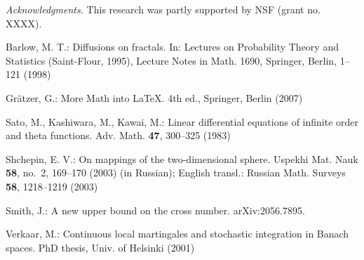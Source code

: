 \documentclass[12pt, twoside]{article}
\theoremstyle{definition}
\numberwithin{equation}{section}
\begin{document}
\bigskip
\footnotesize
\noindent\textit{Acknowledgments.}
This research was partly supported by NSF (grant no. XXXX).

\begin{thebibliography}{SK}




\normalsize
\baselineskip=17pt


Barlow, M. T.: 
Diffusions on fractals.  
In: Lectures on Probability Theory and Statistics (Saint-Flour, 1995), 
Lecture Notes in Math. 1690, Springer, Berlin, 1--121 (1998)


Gr\"atzer, G.:
More Math into \LaTeX.
4th ed., Springer, Berlin (2007)


Sato, M., Kashiwara, M., Kawai, M.: 
Linear differential equations of infinite order and theta functions.
Adv. Math. \textbf{47}, 300--325 (1983)


Shchepin, E. V.:
On mappings of the two-dimensional sphere.  
Uspekhi Mat. Nauk \textbf{58}, no.~2, 169--170 (2003) (in Russian); 
English transl.: Russian Math. Surveys \textbf{58}, 1218--1219 (2003)

Smith, J.:
A new upper bound on the cross number.
arXiv:2056.7895.


Verkaar, M.:
Continuous local martingales and stochastic integration in Banach spaces.
PhD thesis, Univ. of Helsinki (2001)
\end{thebibliography}
\end{document}
